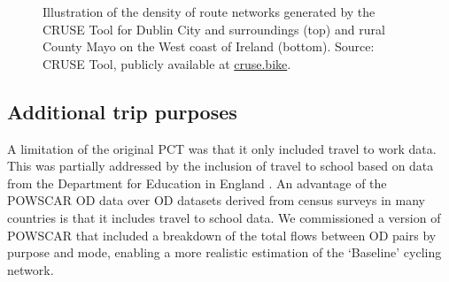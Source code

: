\documentclass[
  super,
  preprint,
  3p]{elsarticle}
\begin{document}
\begin{figure}


\caption{\label{fig-dublin}Illustration of the density of route networks
generated by the CRUSE Tool for Dublin City and surroundings (top) and
rural County Mayo on the West coast of Ireland (bottom). Source: CRUSE
Tool, publicly available at \href{https://cruse.bike/}{cruse.bike}.}

\end{figure}%

\subsection{Additional trip purposes}\label{sec-trip-purposes}

A limitation of the original PCT was that it only included travel to
work data. This was partially addressed by the inclusion of travel to
school based on data from the Department for Education in England
\citep{goodman2019}. An advantage of the POWSCAR OD data over OD
datasets derived from census surveys in many countries is that it
includes travel to school data. We commissioned a version of POWSCAR
that included a breakdown of the total flows between OD pairs by purpose
and mode, enabling a more realistic estimation of the `Baseline' cycling
network.
\end{document}
